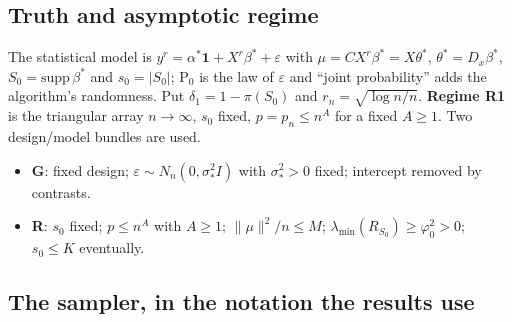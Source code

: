 \documentclass[11pt]{article}
\theoremstyle{definition}
\theoremstyle{remark}
\renewcommand{\Pr}{\mathrm{P}}
\newcommand{\Sz}{S_0}
\begin{document}
\subsection{Truth and asymptotic regime}

The statistical model is $y^r=\alpha^*\mathbf 1+X^r\beta^*+\varepsilon$ with $\mu=CX^r\beta^*=X\theta^*$,
$\theta^*=D_x\beta^*$, $\Sz=\mathrm{supp}\,\beta^*$ and $s_0=|\Sz|$; $\Pr_0$ is the law of $\varepsilon$ and ``joint
probability'' adds the algorithm's randomness. Put $\delta_1=1-\pi(\Sz)$ and $r_n=\sqrt{\log n/n}$.
\textbf{Regime R1} is the triangular array $n\to\infty$, $s_0$ fixed, $p=p_n\le n^{A}$ for a fixed $A\ge1$.
Two design/model bundles are used.
\begin{itemize}
\item \textbf{G}: fixed design; $\varepsilon\sim N_n(0,\sigma_*^2I)$ with $\sigma_*^2>0$ fixed; intercept removed by contrasts.
\item \textbf{R}: $s_0$ fixed; $p\le n^A$ with $A\ge 1$; $\|\mu\|^2/n\le M$; $\lambda_{\min}(R_{\Sz})\ge\varphi_0^2>0$;
$s_0\le K$ eventually.
\end{itemize}

\subsection{The sampler, in the notation the results use}
\end{document}
